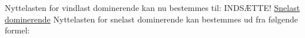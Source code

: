 Nyttelasten for vindlast dominerende kan nu bestemmes til:
\newline
\newline
INDSÆTTE!
\newline
\newline
\underline{Snelast dominerende}
Nyttelasten for snelast dominerende kan bestemmes ud fra følgende formel: 
